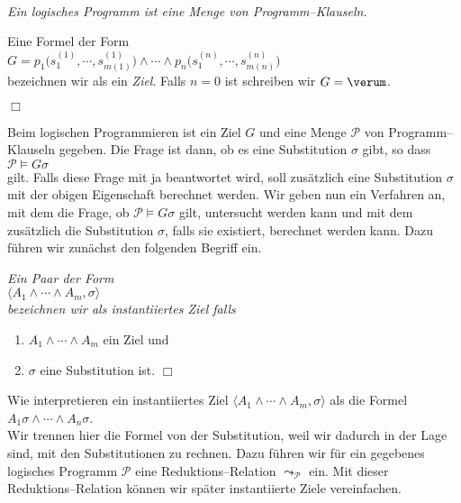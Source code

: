 \begin{Definition} \hspace*{\fill} \\
{\em
    Ein \emph{logisches Programm} ist eine Menge von Programm--Klauseln.  

Eine Formel der Form \\[0.1cm]
\hspace*{1.3cm} 
$G = p_1\big(s^{(1)}_1, \cdots, s^{(1)}_{m(1)}\big) \wedge \cdots \wedge p_n(s^{(n)}_1, \cdots, s^{(n)}_{m(n)}\big)$ \\[0.1cm]
bezeichnen wir als ein \emph{Ziel}.  Falls $n=0$ ist schreiben wir $G = \verum$.
} \hspace*{\fill} $\Box$
\end{Definition}

Beim logischen Programmieren ist ein Ziel $G$ und eine Menge
$\mathcal{P}$ von Programm--Klauseln gegeben.  Die Frage ist dann, ob es eine Substitution $\sigma$ gibt, so dass \\[0.1cm]
\hspace*{1.3cm} $\mathcal{P} \models G\sigma$ \\[0.1cm]
gilt. Falls diese Frage mit ja beantwortet wird, soll zus\"{a}tzlich eine Substitution $\sigma$ mit der obigen Eigenschaft
berechnet werden.
Wir geben nun ein Verfahren an, mit dem die Frage, ob  $\mathcal{P} \models G\sigma$ gilt, untersucht werden kann und mit dem zus\"{a}tzlich
die Substitution $\sigma$, falls sie existiert, berechnet werden kann.  Dazu f\"{u}hren wir zun\"{a}chst den folgenden Begriff
ein.

\begin{Definition}
{\em
    Ein Paar der Form \\[0.1cm]
    \hspace*{1.3cm} $\langle A_1 \wedge \cdots \wedge A_m, \sigma \rangle$ \\[0.1cm]
    bezeichnen wir als {\em instantiiertes Ziel} falls
    \begin{enumerate}
    \item $A_1  \wedge \cdots \wedge A_m$ ein Ziel und
    \item $\sigma$ eine Substitution ist. \hspace*{\fill} $\Box$
    \end{enumerate}
}
\end{Definition}
Wie interpretieren ein instantiiertes Ziel $\langle A_1 \wedge \cdots \wedge A_m, \sigma \rangle$ als die Formel \\[0.1cm]
\hspace*{1.3cm} $A_1\sigma \wedge \cdots \wedge A_n\sigma$. \\[0.1cm]
Wir trennen hier die Formel von der Substitution, weil wir dadurch in der Lage sind,
mit den Substitutionen zu rechnen.  Dazu f\"{u}hren wir 
f\"{u}r ein gegebenes logisches Programm $\mathcal{P}$
eine Reduktions--Relation $\leadsto_\mathcal{P}$ ein.
Mit dieser Reduktions--Relation k\"{o}nnen wir sp\"{a}ter instantiierte Ziele vereinfachen.

